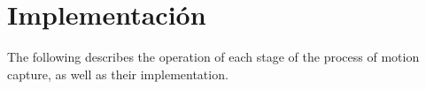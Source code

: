 \section{Implementación}\label{implementacionPosta}
The following describes the operation of each stage of the process of motion capture, as well as their implementation.



